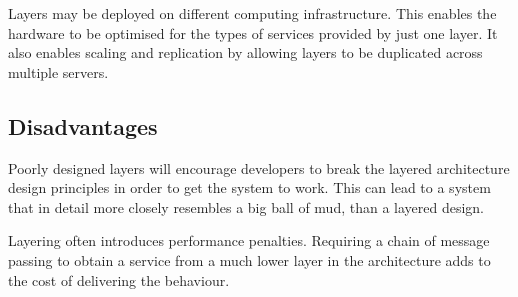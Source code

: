 Layers may be deployed on different computing infrastructure. This enables the hardware to be optimised for the types of services provided by just one layer.
It also enables scaling and replication by allowing layers to be duplicated across multiple servers.

\subsection{Disadvantages}
Poorly designed layers will encourage developers to break the layered architecture design principles in order to get the system to work.
This can lead to a system that in detail more closely resembles a big ball of mud, than a layered design.

Layering often introduces performance penalties.
Requiring a chain of message passing to obtain a service from a much lower layer in the architecture adds to the cost of delivering the behaviour.